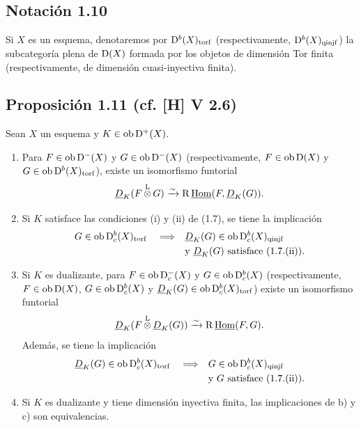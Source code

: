 \subsection*{Notación 1.10}
Si $X$ es un esquema, denotaremos por $\mathrm{D}^{b}(X)_{\mathrm{torf}}$ (respectivamente, $\mathrm{D}^{b}(X)_{\mathrm{qinjf}}$) la subcategoría plena de $\mathrm{D}(X)$ formada por los objetos de dimensión Tor finita (respectivamente, de dimensión cuasi-inyectiva finita).

\subsection*{Proposición 1.11 (cf. [H] V 2.6)}
Sean $X$ un esquema y $K \in \operatorname{ob} \mathrm{D}^{+}(X)$.
\begin{enumerate}
\item[a)] Para $F \in \operatorname{ob} \mathrm{D}^{-}(X)$ y $G \in \operatorname{ob} \mathrm{D}^{-}(X)$ (respectivamente, $F \in \operatorname{ob} \mathrm{D}(X)$ y $G \in \operatorname{ob} \mathrm{D}^{b}(X)_{\mathrm{torf}}$), existe un isomorfismo funtorial
\[
\underline{D}_K(F \mathop{\otimes}\limits^{\mathrm{L}} G) \xrightarrow{\sim} \mathrm{R}\,\underline{\operatorname{Hom}}(F, \underline{D}_K(G)).
\]
\item[b)] Si $K$ satisface las condiciones (i) y (ii) de (1.7), se tiene la implicación
\[
\begin{aligned}
G \in \operatorname{ob} \mathrm{D}_c^{b}(X)_{\mathrm{torf}} \quad \Longrightarrow \quad
&\underline{D}_K(G) \in \operatorname{ob} \mathrm{D}_c^{b}(X)_{\mathrm{qinjf}} \\
&\text{y } \underline{D}_K(G) \text{ satisface (1.7.(ii)).}
\end{aligned}
\]
\item[c)] Si $K$ es dualizante, para $F \in \operatorname{ob} \mathrm{D}_c^{-}(X)$ y $G \in \operatorname{ob} \mathrm{D}_c^{b}(X)$ (respectivamente, $F \in \operatorname{ob} \mathrm{D}(X)$, $G \in \operatorname{ob} \mathrm{D}_c^{b}(X)$ y $\underline{D}_K(G) \in \operatorname{ob} \mathrm{D}_c^{b}(X)_{\mathrm{torf}}$) existe un isomorfismo funtorial
\[
\underline{D}_K(F \mathop{\otimes}\limits^{\mathrm{L}} \underline{D}_K(G)) \xrightarrow{\sim} \mathrm{R}\,\underline{\operatorname{Hom}}(F, G).
\]
Además, se tiene la implicación
\[
\begin{aligned}
\underline{D}_K(G) \in \operatorname{ob} \mathrm{D}_c^{b}(X)_{\mathrm{torf}} \quad \Longrightarrow \quad
&G \in \operatorname{ob} \mathrm{D}_c^{b}(X)_{\mathrm{qinjf}} \\
&\text{y } G \text{ satisface (1.7.(ii)).}
\end{aligned}
\]
\item[d)] Si $K$ es dualizante y tiene dimensión inyectiva finita, las implicaciones de b) y c) son equivalencias.
\end{enumerate}

